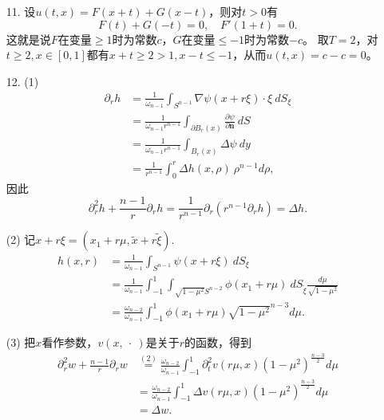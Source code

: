 \begin{itemize}
(i) 若$c=0$，由$u(t,0)=0$有$F(at)+G(-at)=0$对$t>0$成立，
从而当$x<0$时有
\[G(x)=-F(-x)=-\frac{\varphi(-x)}{2}-\frac{\int_0^{-x}\psi}{2a}.\]
(ii) 若$c\neq0$，由$F(x)+G(-x)=c(F'(x)+G'(-x))$得
$$\big(e^\frac{x}{c}G(-x)\big)'=e^\frac{x}{c}\left(-\frac{F(x)}{c}+F'(x)\right),$$
从而当$x<0$时有
$$G(x)=e^\frac{x}{c}\int_0^xe^{-\frac{s}{c}}\left(-\frac{F(-s)}{c}+F'(-s)\right)ds,$$
代入$F$的表达式得出
$$G(x)=e^\frac{x}{c}\int_0^xe^{-\frac{s}{c}}\left(-\frac{\varphi(-s)}{2c}-\frac{\int_0^{-s}\psi}{2ac}
+\frac{\varphi'(-s)}{2}+\frac{\psi(-s)}{2a}\right)ds.$$

\item[11.] 设$u(t,x)=F(x+t)+G(x-t)$，则对$t>0$有
\[F(t)+G(-t)=0, \quad F'(1+t)=0.\]
这就是说$F$在变量$\geqslant1$时为常数$c$，$G$在变量$\leqslant-1$时为常数$-c$。
取$T=2$，对$t\geqslant2,x\in[0,1]$都有$x+t\geqslant2>1,x-t\leqslant-1$，从而$u(t,x)=c-c=0$。

\item[12.] (1) \begin{align*}
    \partial_rh&=\frac{1}{\omega_{n-1}}\int_{S^{n-1}}\nabla\psi(x+r\xi)\cdot\xi\>dS_\xi\\
    &=\frac{1}{\omega_{n-1}r^{n-1}}\int_{\partial B_r(x)}\frac{\partial\psi}{\partial\boldsymbol{n}}\>dS\\
    &=\frac{1}{\omega_{n-1}r^{n-1}}\int_{B_r(x)}\Delta\psi\>dy\\
    &=\frac{1}{r^{n-1}}\int_0^r\Delta h(x,\rho)\>\rho^{n-1}d\rho,
\end{align*}
因此$$\partial^2_rh+\frac{n-1}{r}\partial_rh
    =\frac{1}{r^{n-1}}\partial_r(r^{n-1}\partial_rh)
    =\Delta h.$$

    (2) 记$x+r\xi=(x_1+r\mu,\tilde{x}+r\tilde{\xi})$.
    \begin{align*}
        h(x,r)&=\frac{1}{\omega_{n-1}}\int_{S^{n-1}}\psi(x+r\xi)\>dS_\xi\\
        &=\frac{1}{\omega_{n-1}}\int_{-1}^1\int_{\sqrt{1-\mu^2}S^{n-2}}\phi(x_1+r\mu)\>dS_{\tilde{\xi}}\frac{d\mu}{\sqrt{1-\mu^2}}\\
        &=\frac{\omega_{n-2}}{\omega_{n-1}}\int_{-1}^1\phi(x_1+r\mu)\sqrt{1-\mu^2}^{n-3}d\mu.
    \end{align*}

    (3) 把$x$看作参数，$v(x,\>\cdot\>)$是关于$r$的函数，得到
    \begin{align*}
        \partial^2_rw+\frac{n-1}{r}\partial_rw
        &\overset{(2)}{=}\frac{\omega_{n-2}}{\omega_{n-1}}\int_{-1}^1\partial^2_tv(r\mu,x)(1-\mu^2)^\frac{n-3}{2}d\mu\\
        &=\frac{\omega_{n-2}}{\omega_{n-1}}\int_{-1}^1\Delta v(r\mu,x)(1-\mu^2)^\frac{n-3}{2}d\mu\\
        &=\Delta w.
    \end{align*}


\end{itemize}
